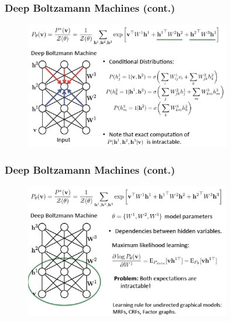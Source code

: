 \documentclass{beamer}
\begin{document}

\begin{frame}
\frametitle{Deep Boltzamann Machines (cont.)}
\begin{figure}
\centering
  \includegraphics[width=0.8\textwidth]{figs/p2.png}
\end{figure}
\end{frame}


\begin{frame}
\frametitle{Deep Boltzamann Machines (cont.)}
\begin{figure}
\centering
  \includegraphics[width=0.8\textwidth]{figs/p3.png}
\end{figure}
\end{frame}

\end{document}
